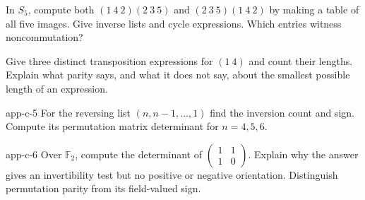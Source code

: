 \begin{exercise}
In $S_5$, compute both $(1\ 4\ 2)(2\ 3\ 5)$ and
$(2\ 3\ 5)(1\ 4\ 2)$ by making a table of all five images. Give
inverse lists and cycle expressions. Which entries witness noncommutation?
\end{exercise}
\begin{exercise}
Give three distinct transposition expressions for $(1\ 4)$ and count
their lengths. Explain what parity says, and what it does not say, about
the smallest possible length of an expression.
\end{exercise}
\begin{hexercise}{app-c-5}
For the reversing list $(n,n-1,\ldots,1)$ find the inversion count and
sign. Compute its permutation matrix determinant for $n=4,5,6$.
\end{hexercise}
\begin{hexercise}{app-c-6}
Over $\mathbb F_2$, compute the determinant of
$\left(\begin{matrix}1&1\\1&0\end{matrix}\right)$.
Explain why the answer gives an invertibility test but no positive or
negative orientation. Distinguish permutation parity from its field-valued sign.
\end{hexercise}
